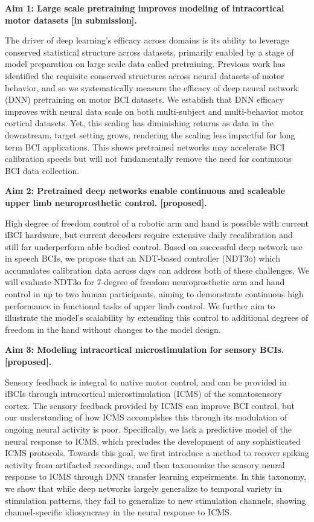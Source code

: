\documentclass[12pt,oneside]{report}
\begin{document}
\textbf{Aim 1: Large scale pretraining improves modeling of intracortical motor datasets [in submission].}

The driver of deep learning’s efficacy across domains is its ability to leverage conserved statistical structure across datasets, primarily enabled by a stage of model preparation on large scale data called pretraining. Previous work has identified the requisite conserved structures across neural datasets of motor behavior, and so we systematically measure the efficacy of deep neural network (DNN) pretraining on motor BCI datasets. We establish that DNN efficacy improves with neural data scale on both multi-subject and multi-behavior motor cortical datasets. Yet, this scaling has diminishing returns as data in the downstream, target setting grows, rendering the scaling less impactful for long term BCI applications. This shows pretrained networks may accelerate BCI calibration speeds but will not fundamentally remove the need for continuous BCI data collection.

\textbf{Aim 2: Pretrained deep networks enable continuous and scaleable upper limb neuroprosthetic control. [proposed].}

High degree of freedom control of a robotic arm and hand is possible with current iBCI hardware, but current decoders require extensive daily recalibration and still far underperform able bodied control. Based on successful deep network use in speech BCIs, we propose that an NDT-based controller (NDT3o) which accumulates calibration data across days can address both of these challenges. We will evaluate NDT3o for 7-degree of freedom neuroprosthetic arm and hand control in up to two human participants, aiming to demonstrate continuous high performance in functional tasks of upper limb control. We further aim to illustrate the model’s scalability by extending this control to additional degrees of freedom in the hand without changes to the model design.

\textbf{Aim 3: Modeling intracortical microstimulation for sensory BCIs. [proposed].}

Sensory feedback is integral to native motor control, and can be provided in iBCIs through intracortical microstimulation (ICMS) of the somatosensory cortex. The sensory feedback provided by ICMS can improve BCI control, but our understanding of how ICMS accomplshes this through its modulation of ongoing neural activity is poor. Specifically, we lack a predictive model of the neural response to ICMS, which precludes the development of any sophisticated ICMS protocols. Towards this goal, we first introduce a method to recover spiking activity from artifacted recordings, and then taxonomize the sensory neural response to ICMS through DNN transfer learning expeirments. In this taxonomy, we show that while deep networks largely generalize to temporal variety in stimulation patterns, they fail to generalize to new stimulation channels, showing channel-specific idiosyncrasy in the neural response to ICMS.
\end{document}
